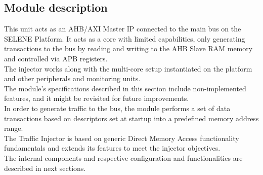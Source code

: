 \subsection{Module description}
\label{module_desc}
This unit acts as an AHB/AXI Master IP connected to the main bus on the SELENE Platform. It acts as a core with limited capabilities, only generating transactions to the bus by reading and writing to the AHB Slave RAM memory and controlled via APB registers.\\
The injector works along with the multi-core setup instantiated on the platform and other peripherals and monitoring units.\\
The module's specifications described in this section include non-implemented features, and it might be revisited for future improvements.\\
In order to generate traffic to the bus, the module performs a set of data transactions based on descriptors set at startup into a predefined memory address range.\\
The Traffic Injector is based on generic Direct Memory Access functionality fundamentals and extends its features to meet the injector objectives.\\
The internal components and respective configuration and functionalities are described in next sections.


